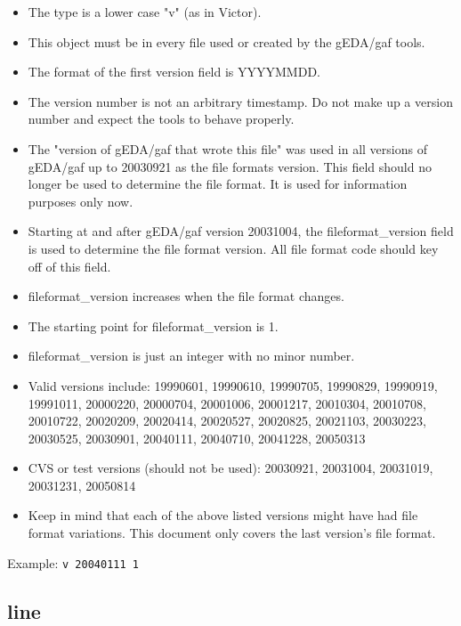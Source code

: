 \documentclass{article}
\begin{document}
\begin{itemize}
\item The type is a lower case "v" (as in Victor).
\item This object must be in every file used or created by the gEDA/gaf tools.
\item The format of the first version field is YYYYMMDD.  
\item The version number is not an arbitrary timestamp.  Do not make up a 
      version number and expect the tools to behave properly.  
\item The "version of gEDA/gaf that wrote this file" was used in all versions of gEDA/gaf up to 20030921 as the file formats version.  This field should no longer be used to determine the file format.  It is used for information purposes only now. 
\item Starting at and after gEDA/gaf version 20031004, the fileformat\_version field is used to determine the file format version.  All file format code should key off of this field.
\item fileformat\_version increases when the file format changes.
\item The starting point for fileformat\_version is 1.
\item fileformat\_version is just an integer with no minor number.

\item Valid versions include: 
19990601, 19990610, 19990705, 19990829, 19990919, 19991011, 20000220, 20000704,
20001006, 20001217, 20010304, 20010708, 20010722, 20020209, 20020414, 20020527,
20020825, 20021103, 20030223, 20030525, 20030901, 20040111, 20040710, 20041228,
20050313

\item CVS or test versions (should not be used): 
20030921, 20031004, 20031019, 20031231, 20050814

\item Keep in mind that each of the above listed versions might have had 
file format variations.  This document only covers the last version's file 
format.

\end{itemize}

Example: \newline
{\tt v 20040111 1}


\subsection{line}
\end{document}
